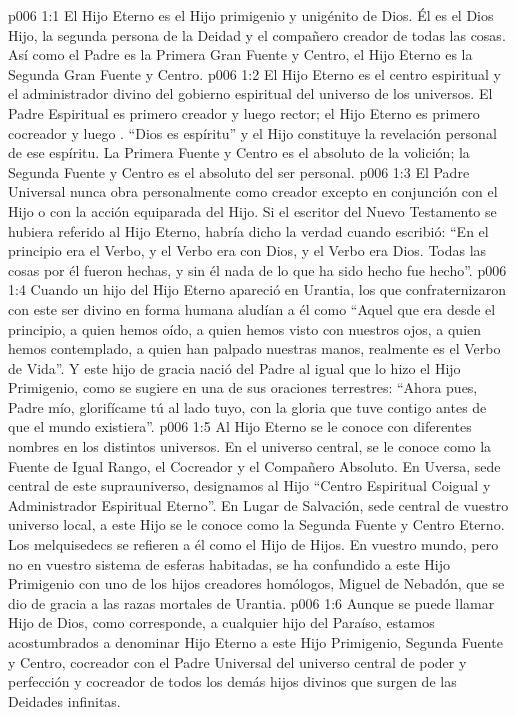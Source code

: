 \vs p006 1:1 El Hijo Eterno es el Hijo primigenio y unigénito de Dios. Él es el Dios Hijo, la segunda persona de la Deidad y el compañero creador de todas las cosas. Así como el Padre es la Primera Gran Fuente y Centro, el Hijo Eterno es la Segunda Gran Fuente y Centro.
\vs p006 1:2 El Hijo Eterno es el centro espiritual y el administrador divino del gobierno espiritual del universo de los universos. El Padre Espiritual es primero creador y luego rector; el Hijo Eterno es primero cocreador y luego . “Dios es espíritu” y el Hijo constituye la revelación personal de ese espíritu. La Primera Fuente y Centro es el absoluto de la volición; la Segunda Fuente y Centro es el absoluto del ser personal.
\vs p006 1:3 El Padre Universal nunca obra personalmente como creador excepto en conjunción con el Hijo o con la acción equiparada del Hijo. Si el escritor del Nuevo Testamento se hubiera referido al Hijo Eterno, habría dicho la verdad cuando escribió: “En el principio era el Verbo, y el Verbo era con Dios, y el Verbo era Dios. Todas las cosas por él fueron hechas, y sin él nada de lo que ha sido hecho fue hecho”.
\vs p006 1:4 Cuando un hijo del Hijo Eterno apareció en Urantia, los que confraternizaron con este ser divino en forma humana aludían a él como “Aquel que era desde el principio, a quien hemos oído, a quien hemos visto con nuestros ojos, a quien hemos contemplado, a quien han palpado nuestras manos, realmente es el Verbo de Vida”. Y este hijo de gracia nació del Padre al igual que lo hizo el Hijo Primigenio, como se sugiere en una de sus oraciones terrestres: “Ahora pues, Padre mío, glorifícame tú al lado tuyo, con la gloria que tuve contigo antes de que el mundo existiera”.
\vs p006 1:5 \pc Al Hijo Eterno se le conoce con diferentes nombres en los distintos universos. En el universo central, se le conoce como la Fuente de Igual Rango, el Cocreador y el Compañero Absoluto. En Uversa, sede central de este suprauniverso, designamos al Hijo “Centro Espiritual Coigual y Administrador Espiritual Eterno”. En Lugar de Salvación, sede central de vuestro universo local, a este Hijo se le conoce como la Segunda Fuente y Centro Eterno. Los melquisedecs se refieren a él como el Hijo de Hijos. En vuestro mundo, pero no en vuestro sistema de esferas habitadas, se ha confundido a este Hijo Primigenio con uno de los hijos creadores homólogos, Miguel de Nebadón, que se dio de gracia a las razas mortales de Urantia.
\vs p006 1:6 Aunque se puede llamar Hijo de Dios, como corresponde, a cualquier hijo del Paraíso, estamos acostumbrados a denominar Hijo Eterno a este Hijo Primigenio, Segunda Fuente y Centro, cocreador con el Padre Universal del universo central de poder y perfección y cocreador de todos los demás hijos divinos que surgen de las Deidades infinitas.
